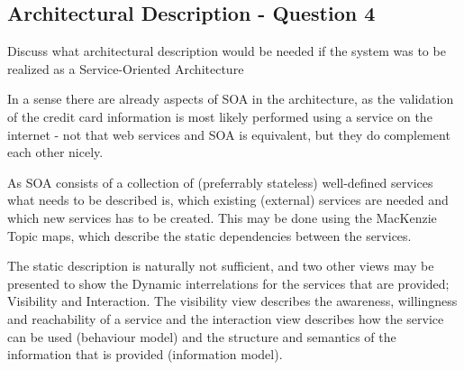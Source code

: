 \subsection{Architectural Description - Question 4}

\begin{question}
Discuss what architectural description would be needed if
the system was to be realized as a Service-Oriented Architecture
\end{question}

In a sense there are already aspects of SOA in the architecture, as the validation of the credit card information is most likely performed using a service on the internet - not that web services and SOA is equivalent, but they do complement each other nicely.

As SOA consists of a collection of (preferrably stateless) well-defined services what needs to be described is, which existing (external) services are needed and which new services has to be created. This may be done using the MacKenzie Topic maps, which describe the static dependencies between the services.

The static description is naturally not sufficient, and two other views may be presented to show the Dynamic interrelations for the services that are provided; Visibility and Interaction. The visibility view describes the awareness, willingness and reachability of a service and the interaction view describes how the service can be used (behaviour model) and the structure and semantics of the information that is provided (information model).

